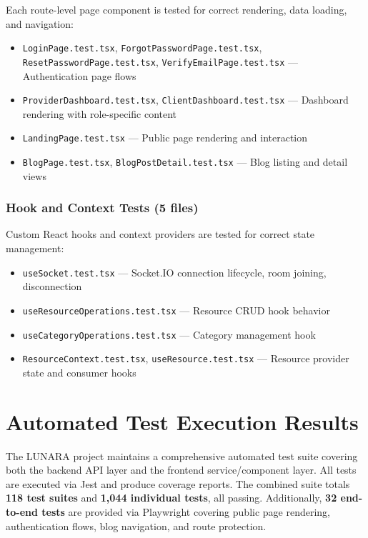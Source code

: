 \documentclass[12pt,letterpaper]{article}
\begin{document}
Each route-level page component is tested for correct rendering, data loading, and navigation:

\begin{itemize}[nosep]
  \item \texttt{LoginPage.test.tsx}, \texttt{ForgotPasswordPage.test.tsx}, \texttt{ResetPasswordPage.test.tsx}, \texttt{VerifyEmailPage.test.tsx} --- Authentication page flows
  \item \texttt{ProviderDashboard.test.tsx}, \texttt{ClientDashboard.test.tsx} --- Dashboard rendering with role-specific content
  \item \texttt{LandingPage.test.tsx} --- Public page rendering and interaction
  \item \texttt{BlogPage.test.tsx}, \texttt{BlogPostDetail.test.tsx} --- Blog listing and detail views
\end{itemize}

\subsubsection{Hook and Context Tests (5 files)}

Custom React hooks and context providers are tested for correct state management:

\begin{itemize}[nosep]
  \item \texttt{useSocket.test.tsx} --- Socket.IO connection lifecycle, room joining, disconnection
  \item \texttt{useResourceOperations.test.tsx} --- Resource CRUD hook behavior
  \item \texttt{useCategoryOperations.test.tsx} --- Category management hook
  \item \texttt{ResourceContext.test.tsx}, \texttt{useResource.test.tsx} --- Resource provider state and consumer hooks
\end{itemize}

\section{Automated Test Execution Results}

The LUNARA project maintains a comprehensive automated test suite covering both the backend API layer and the frontend service/component layer. All tests are executed via Jest and produce coverage reports. The combined suite totals \textbf{118 test suites} and \textbf{1,044 individual tests}, all passing. Additionally, \textbf{32 end-to-end tests} are provided via Playwright covering public page rendering, authentication flows, blog navigation, and route protection.
\end{document}
